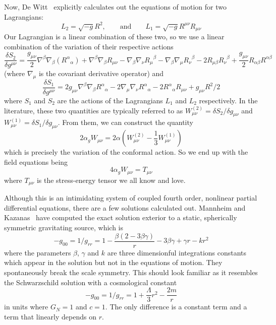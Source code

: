 Now, De Witt~\cite{dewitt1964} explicitly calculates out the
equations of motion for two Lagrangians:
\begin{equation}
L_{2} = \sqrt{-g}R^{2},\qquad\text{and}\qquad L_{1}=\sqrt{-g}R^{\mu\nu}R_{\mu\nu}
\end{equation}
Our Lagrangian is a linear combination of these two, so we use a
linear combination of the variation of their respective actions
\begin{equation}
\frac{\delta S_{2}}{\delta g^{\mu\nu}} = \frac{g_{\mu\nu}}{2}
\nabla^{\beta}\nabla_{\beta}({R^{\alpha}}_{\alpha})  +
\nabla^{\beta}\nabla_{\beta}R_{\mu\nu}  -
\nabla_{\beta}\nabla_{\nu}{R_{\mu}}^{\beta} - \nabla_{\beta}\nabla_{\mu}{R_{\nu}}^{\beta}
-2R_{\mu\beta}{R_{\nu}}^{\beta} + \frac{g_{\mu\nu}}{2}R_{\alpha\beta}R^{\alpha\beta}
\end{equation}
(where $\nabla_{\mu}$ is the covariant derivative operator) and
\begin{equation}
\frac{\delta S_{1}}{\delta g^{\mu\nu}} =
2g_{\mu\nu}\nabla^{\beta}\nabla_{\beta}{R^{\alpha}}_{\alpha}
-2\nabla_{\mu}\nabla_{\nu}{R^{\alpha}}_{\alpha} -
2{R^{\alpha}}_{\alpha}R_{\mu\nu} + g_{\mu\nu}R^{2}/2
\end{equation}
where $S_1$ and $S_2$ are the actions of the Lagrangians $L_1$
and $L_2$ respectively. In the literature, these two quantities
are typically referred to as $W^{(2)}_{\mu\nu} = \delta
S_{2}/\delta g_{\mu\nu}$ and $W^{(1)}_{\mu\nu} = \delta
S_{1}/\delta g_{\mu\nu}$. From them, we can construct the quantity
\begin{equation}
2\alpha_{g}W_{\mu\nu} = 2\alpha(W^{(2)}_{\mu\nu} -
\frac{1}{3}W^{(1)}_{\mu\nu})
\end{equation}
which is precisely the variation of the conformal action. So we
end up with the field equations being
\begin{equation}
4\alpha_{g}W_{\mu\nu} = T_{\mu\nu}
\end{equation}
where $T_{\mu\nu}$ is the stress-energy tensor we all know and love.

Although this is an intimidating system of coupled fourth order,
nonlinear partial differential equations, there are a few
solutions calculated out. Mannheim and
Kazanas~\cite{Mannheim:1988dj} have computed the exact solution
exterior to a static, spherically symmetric gravitating source,
which is
\begin{equation}
-g_{00} = 1/g_{rr} = 1 - \frac{\beta(2 - 3\beta\gamma)}{r} - 3\beta\gamma
+ \gamma r - kr^2
\end{equation}
where the parameters $\beta$, $\gamma$ and $k$ are three
dimensionful integrations constants which appear in the solution
but not in the equations of motion. They spontaneously break the
scale symmetry. This should look familiar as it resembles the
Schwarzschild solution with a cosmological constant
\begin{equation}\label{exteriorMetric}
-g_{00} = 1/g_{rr} = 1 + \frac{\Lambda}{3}r^{2} - \frac{2m}{r}
\end{equation}
in units where $G_{N} = 1$ and $c=1$. The only difference is a
constant term and a term that linearly depends on $r$.

